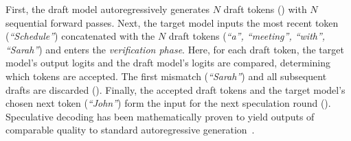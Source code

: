First, the draft model autoregressively generates $N$ draft tokens () with $N$ sequential forward passes. Next, the target model inputs the most recent token (\textit{``Schedule''}) concatenated with the $N$ draft tokens (\textit{``a'', ``meeting'', ``with'', ``Sarah''}) and enters the \textit{verification phase}. Here, for each draft token, the target model’s output logits and the draft model’s logits are compared, determining which tokens are accepted. The first mismatch (\textit{``Sarah''}) and all subsequent drafts are discarded (). Finally, the accepted draft tokens and the target model’s chosen next token (\textit{``John''}) form the input for the next speculation round (). Speculative decoding has been mathematically proven to yield outputs of comparable quality to standard autoregressive generation~\cite{specdec, sps}.
